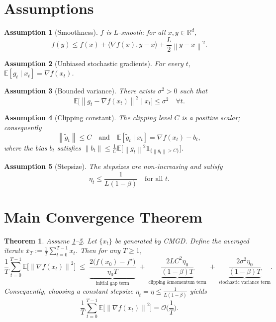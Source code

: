\documentclass{article}
\newtheorem{theorem}{Theorem}
\newtheorem{assumption}{Assumption}
\newcommand{\E}{\mathbb{E}}
\newcommand{\norm}[1]{\left\lVert #1 \right\rVert}
\newcommand{\R}{\mathbb{R}}
\begin{document}
\section*{Assumptions}
\begin{assumption}[Smoothness]\label{as:smooth}
$f$ is $L$‑smooth: for all $x,y\in\R^{d}$,
\[
f(y)\le f(x)+\langle\nabla f(x),y-x\rangle+\frac{L}{2}\norm{y-x}^{2}.
\]
\end{assumption}
\begin{assumption}[Unbiased stochastic gradients]\label{as:unbiased}
For every $t$, $\E[g_t\mid x_t]=\nabla f(x_t)$.
\end{assumption}
\begin{assumption}[Bounded variance]\label{as:variance}
There exists $\sigma^{2}>0$ such that
\[
\E\big[\norm{g_t-\nabla f(x_t)}^{2}\mid x_t\big]\le\sigma^{2}\quad\forall t .
\]
\end{assumption}
\begin{assumption}[Clipping constant]\label{as:clip}
The clipping level $C$ is a positive scalar; consequently
\[
\norm{\tilde g_t}\le C\quad\text{and}\quad \E[\tilde g_t\mid x_t]=\nabla f(x_t)-b_t,
\]
where the bias $b_t$ satisfies $\norm{b_t}\le \frac{1}{C}\E\big[\norm{g_t}^{2}\mathbf{1}_{\{\norm{g_t}>C\}}\big]$.
\end{assumption}
\begin{assumption}[Stepsize]\label{as:stepsize}
The stepsizes are non‑increasing and satisfy
\[
\eta_t\le \frac{1}{L(1-\beta)}\quad\text{for all }t .
\]
\end{assumption}

\section*{Main Convergence Theorem}
\begin{theorem}\label{thm:main}
Assume \ref{as:smooth}–\ref{as:stepsize}. Let $\{x_t\}$ be generated by CMGD.
Define the averaged iterate $\bar x_T:=\frac1T\sum_{t=0}^{T-1}x_t$.
Then for any $T\ge 1$,
\[
\frac{1}{T}\sum_{t=0}^{T-1}\E\!\big[\norm{\nabla f(x_t)}^{2}\big]
\;\le\;
\underbrace{\frac{2\big(f(x_0)-f^\star\big)}{\eta_0 T}}_{\text{initial gap term}}
\;+\;
\underbrace{\frac{2L C^{2}\eta_0}{(1-\beta)T}}_{\text{clipping \& momentum term}}
\;+\;
\underbrace{\frac{2\sigma^{2}\eta_0}{(1-\beta)T}}_{\text{stochastic variance term}} .
\]
Consequently, choosing a constant stepsize $\eta_t=\eta\le\frac{1}{L(1-\beta)}$ yields
\[
\frac{1}{T}\sum_{t=0}^{T-1}\E\!\big[\norm{\nabla f(x_t)}^{2}\big]=\mathcal{O}\!\Big(\frac{1}{T}\Big).
\]
\end{theorem}
\end{document}
